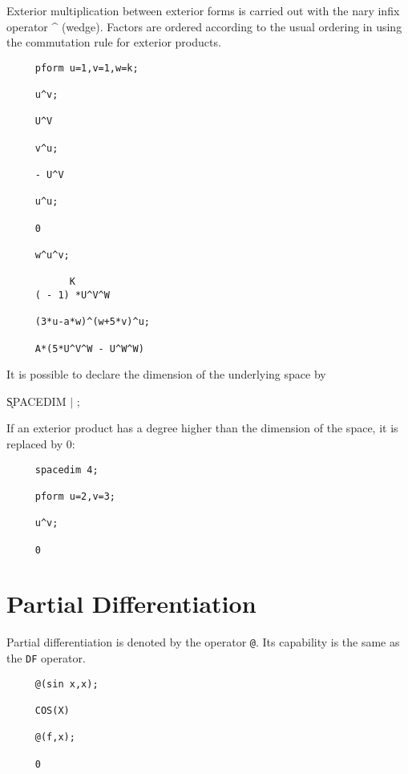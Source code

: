  
Exterior multiplication between exterior forms is carried out with the
nary infix operator \^{ } (wedge)\label{wedge}.  Factors are ordered
according to the usual ordering in {\REDUCE} using the commutation
rule for exterior products.

\example{}

\begin{verbatim}
     pform u=1,v=1,w=k;

     u^v;

     U^V

     v^u;

     - U^V

     u^u;

     0

     w^u^v;

           K
     ( - 1) *U^V^W

     (3*u-a*w)^(w+5*v)^u;

     A*(5*U^V^W - U^W^W)
\end{verbatim}

It is possible to declare the dimension of the underlying space
by\label{SPACEDIM}  

\hspace*{2em} \k{SPACEDIM}  $\mid$ ;

If an exterior product has a degree higher than the dimension of the
space, it is replaced by 0:

\begin{verbatim}
     spacedim 4;

     pform u=2,v=3;

     u^v;

     0
\end{verbatim}


\section{Partial Differentiation}

Partial differentiation is denoted by the operator {\tt @}\label{at}.  Its
capability is the same as the {\REDUCE} {\tt DF} operator.
 

\example{}

\begin{verbatim}
     @(sin x,x);

     COS(X)

     @(f,x);

     0
\end{verbatim}

